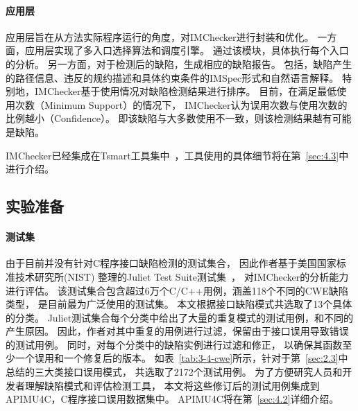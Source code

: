 \paragraph{应用层}
应用层旨在从方法实际程序运行的角度，对IMChecker进行封装和优化。
一方面，应用层实现了多入口选择算法和调度引擎。
通过该模块，具体执行每个入口的分析。
另一方面，对于检测后的缺陷，生成相应的缺陷报告。
包括，缺陷产生的路径信息、违反的规约描述和具体约束条件的IMSpec形式和自然语言解释。
特别地，IMChecker基于使用情况对缺陷检测结果进行排序。
目前，在满足最低使用次数（Minimum Support）的情况下，
IMChecker认为误用次数与使用次数的比例越小（Confidence）。
即该缺陷与大多数使用不一致，则该检测结果越有可能是缺陷。

IMChecker已经集成在Tsmart工具集中~\cite{tsmart}，工具使用的具体细节将在第~\ref{sec:4.3}中进行介绍。

\subsection{实验准备}

\paragraph{测试集} 由于目前并没有针对C程序接口缺陷检测的测试集合，
因此作者基于美国国家标准技术研究所(NIST) 整理的Juliet Test Suite测试集~\cite{juliet}，
对IMChecker的分析能力进行评估。
该测试集合包含超过6万个C/C++用例，涵盖118个不同的CWE缺陷类型，
是目前最为广泛使用的测试集。
本文根据接口缺陷模式共选取了13个具体的分类。
Juliet测试集合每个分类中给出了大量的重复模式的测试用例，和不同的产生原因。
因此，作者对其中重复的用例进行过滤，保留由于接口误用导致错误的测试用例。
同时，对每个分类中的缺陷实例进行过滤和修正，
以确保其函数至少一个误用和一个修复后的版本。
如表~\ref{tab:3-4-cwe}所示，针对于第~\ref{sec:2.3}中总结的三大类接口误用模式，
共选取了2172个测试用例。
为了方便研究人员和开发者理解缺陷模式和评估检测工具，
本文将这些修订后的测试用例集成到APIMU4C，C程序接口误用数据集中。
APIMU4C将在第~\ref{sec:4.2}详细介绍。




